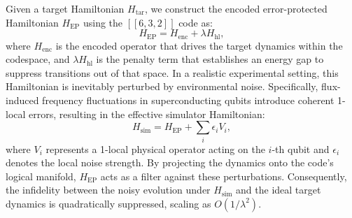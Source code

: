 \documentclass[%
10pt,tightenlines,
superscriptaddress,
 amsmath,amssymb,
 aps,
pra,
]{revtex4-2}
\begin{document}
Given a target Hamiltonian $H_{\text{tar}}$, we construct the encoded error-protected Hamiltonian $H_{\text{EP}}$ using the $[[6,3,2]]$ code as:
\begin{equation}
H_{\text{EP}} = H_{\text{enc}} + \lambda H_{\text{hl}},
\end{equation}
where $H_{\text{enc}}$ is the encoded operator that drives the target dynamics within the codespace, and $\lambda H_{\text{hl}}$ is the penalty term that establishes an energy gap to suppress transitions out of that space. In a realistic experimental setting, this Hamiltonian is inevitably perturbed by environmental noise. Specifically, flux-induced frequency fluctuations in superconducting qubits introduce coherent 1-local errors, resulting in the effective simulator Hamiltonian:
\begin{equation}
H_{\text{sim}} = H_{\text{EP}} + \sum_i \epsilon_i V_i,
\end{equation}
where $V_i$ represents a 1-local physical operator acting on the $i$-th qubit and $\epsilon_i$ denotes the local noise strength. By projecting the dynamics onto the code’s logical manifold, $H_{\text{EP}}$ acts as a filter against these perturbations. Consequently, the infidelity between the noisy evolution under $H_{\text{sim}}$ and the ideal target dynamics is quadratically suppressed, scaling as $O(1/\lambda^2)$.
\end{document}
